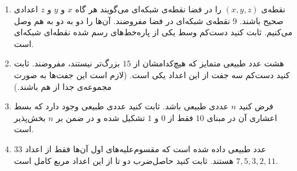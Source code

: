 \EXERCISE
\begin{enumerate}
\item
نقطه‌ی
$(x, y, z)$
را در فضا نقطه‌ی شبکه‌ای می‌گویند هر گاه
$x$
و
$y$
و
$z$
اعدادی صحیح باشند.
$9$
نقطه‌ی شبکه‌ای در فضا مفروضند. آن‌ها را دو به دو به هم وصل می‌کنیم. ثابت کنید دست‌کم وسط یکی از پاره‌خط‌های رسم شده نقطه‌ای شبکه‌ای است.
\item
هشت عدد طبیعی متمایز که هیچ‌کدامشان از
$15$
بزرگ‌تر نیستند، مفروضند. ثابت کنید دست‌کم سه جفت از این اعداد یکی است. (لازم است این جفت‌ها به صورت مجموعه‌ی جدا از هم باشند.)
\item
فرض کنید
$n$
عددی طبیعی باشد. ثابت کنید عددی طبیعی وجود دارد که بسط اعشاری آن در مبنای
$10$
فقط از
$0$
و
$1$
تشکیل شده و در ضمن بر
$n$
بخش‌پذیر است.
\item
$33$
عدد طبیعی داده شده است که مقسوم‌علیه‌های اول آن‌ها فقط از اعداد
$7, 5, 3, 2, 11$
هستند. ثابت کنید حاصل‌ضرب دو تا از این اعداد مربع کامل است.
\end{enumerate}